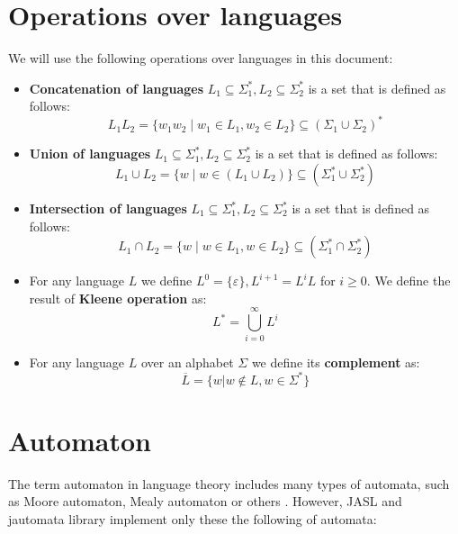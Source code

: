 \documentclass{ctuthesis}
\begin{document}
\section{Operations over languages}
\label{sec:operations-languages-def}
We will use the following operations over languages in this document:
\begin{itemize}
	\item \textbf{Concatenation of languages} $L_1 \subseteq \Sigma^*_1, L_2 \subseteq \Sigma^*_2$ is a set that is defined as follows:
	\begin{equation*}
		L_1L_2 = \{w_1w_2 \mid w_1 \in L_1, w_2 \in L_2\} \subseteq (\Sigma_1 \cup \Sigma_2)^*
	\end{equation*}
	
	\item \textbf{Union of languages} $L_1 \subseteq \Sigma^*_1, L_2 \subseteq \Sigma^*_2$ is a set that is defined as follows:
	\begin{equation*}
		L_1\cup L_2 = \{w \mid w \in (L_1 \cup L_2) \} \subseteq (\Sigma_1^* \cup \Sigma_2^*)
	\end{equation*}
	
	\item \textbf{Intersection of languages} $L_1 \subseteq \Sigma^*_1, L_2 \subseteq \Sigma^*_2$ is a set that is defined as follows:
	\begin{equation*}
		L_1 \cap L_2 = \{w \mid w \in L_1, w \in L_2 \} \subseteq (\Sigma^*_1 \cap \Sigma^*_2)
	\end{equation*}
	
	\item For any language $L$ we define $L^0 = \{\varepsilon\}, L^{i+1} = L^iL$ for $i \geq 0$. We define the result of \textbf{Kleene operation} as:
	\begin{equation*}
		L^* = \bigcup^{\infty}_{i=0} L^i
	\end{equation*}
	
	\item For any language $L$ over an alphabet $\Sigma$ we define its \textbf{complement} as: 
	\begin{equation*}
		\overline{L} = \{w | w \not \in L, w \in \Sigma^*\}
	\end{equation*}
\end{itemize}

\section{Automaton}
\label{sec:automaton-def}
The term automaton in language theory includes many types of automata, such as Moore automaton, Mealy automaton or others \cite{melichar}. However, JASL and jautomata library implement only these the following of automata:
\end{document}
